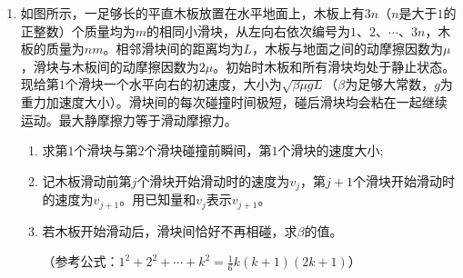 \documentclass[\gkver]{gaokaozhenti}
\begin{document}
\begin{enumerate}
\item 
如图所示，一足够长的平直木板放置在水平地面上，木板上有$ 3n $（$ n $是大于$ 1 $的正整数）个质量均为$ m $的相同小滑块，从左向右依次编号为$ 1 $、$ 2 $、$ \cdots $、$ 3n $，木板的质量为$ nm $。相邻滑块间的距离均为$ L $，木板与地面之间的动摩擦因数为$ \mu $，滑块与木板间的动摩擦因数为$ 2 \mu $。初始时木板和所有滑块均处于静止状态。现给第$ 1 $个滑块一个水平向右的初速度，大小为$\sqrt{\beta \mu gL }$（$ \beta $为足够大常数，$ g $为重力加速度大小）。滑块间的每次碰撞时间极短，碰后滑块均会粘在一起继续运动。最大静摩擦力等于滑动摩擦力。
\begin{enumerate}
	\item
	求第$ 1 $个滑块与第$ 2 $个滑块碰撞前瞬间，第$ 1 $个滑块的速度大小;
	
	\item 
	记木板滑动前第$ j $个滑块开始滑动时的速度为$ v_j $，第$ j+1 $个滑块开始滑动时的速度为$ v_{j+1} $。用已知量和$ v_j $表示$ v_{j+1} $。
	
	\item 
	若木板开始滑动后，滑块间恰好不再相碰，求$ \beta $的值。
	
	（参考公式：$ 1^2+2^2+ \cdots +k^2= \frac{1}{6} k(k+1)(2k+1) $）
	
	
\end{enumerate}


\end{enumerate}
\end{document}
